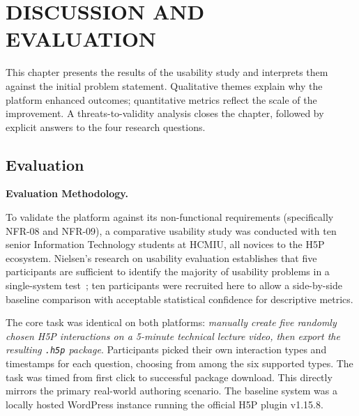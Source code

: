 \chapter{DISCUSSION AND EVALUATION}
\label{ch:discussion}

This chapter presents the results of the usability study and interprets them against the initial problem statement. Qualitative themes explain why the platform enhanced outcomes; quantitative metrics reflect the scale of the improvement. A threats-to-validity analysis closes the chapter, followed by explicit answers to the four research questions.

\section{Evaluation}

\textbf{Evaluation Methodology.}

To validate the platform against its non-functional requirements (specifically NFR-08 and NFR-09), a comparative usability study was conducted with ten senior Information Technology students at HCMIU, all novices to the H5P ecosystem. Nielsen's research on usability evaluation establishes that five participants are sufficient to identify the majority of usability problems in a single-system test~\cite{nielsen1994}; ten participants were recruited here to allow a side-by-side baseline comparison with acceptable statistical confidence for descriptive metrics.

The core task was identical on both platforms: \emph{manually create five randomly chosen H5P interactions on a 5-minute technical lecture video, then export the resulting \texttt{.h5p} package}. Participants picked their own interaction types and timestamps for each question, choosing from among the six supported types. The task was timed from first click to successful package download. This directly mirrors the primary real-world authoring scenario. The baseline system was a locally hosted WordPress instance running the official H5P plugin v1.15.8.

